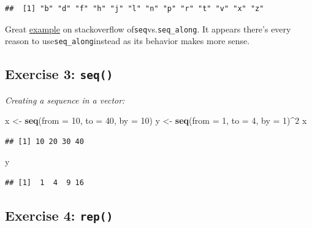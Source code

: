 \documentclass[
]{book}
\newenvironment{Shaded}{\begin{snugshade}}{\end{snugshade}}
\newcommand{\DataTypeTok}[1]{\textcolor[rgb]{0.13,0.29,0.53}{#1}}
\newcommand{\DecValTok}[1]{\textcolor[rgb]{0.00,0.00,0.81}{#1}}
\newcommand{\KeywordTok}[1]{\textcolor[rgb]{0.13,0.29,0.53}{\textbf{#1}}}
\newcommand{\NormalTok}[1]{#1}
\newcommand{\OperatorTok}[1]{\textcolor[rgb]{0.81,0.36,0.00}{\textbf{#1}}}
\newcommand{\StringTok}[1]{\textcolor[rgb]{0.31,0.60,0.02}{#1}}
\begin{document}
\begin{verbatim}
##  [1] "b" "d" "f" "h" "j" "l" "n" "p" "r" "t" "v" "x" "z"
\end{verbatim}

Great \href{https://stackoverflow.com/questions/13732062/what-are-examples-of-when-seq-along-works-but-seq-produces-unintended-results}{example} on stackoverflow of\texttt{seq}vs.\texttt{seq\_along}. It appears there's every reason to
use\texttt{seq\_along}instead as its behavior makes more sense.

\hypertarget{exercise-3-seq}{%
\subsection{\texorpdfstring{Exercise 3: \texttt{seq()}}{Exercise 3: seq()}}\label{exercise-3-seq}}

\emph{Creating a sequence in a vector:}

\begin{Shaded}
\begin{Highlighting}[]
\NormalTok{x <-}\StringTok{ }\KeywordTok{seq}\NormalTok{(}\DataTypeTok{from =} \DecValTok{10}\NormalTok{, }\DataTypeTok{to =} \DecValTok{40}\NormalTok{, }\DataTypeTok{by =} \DecValTok{10}\NormalTok{)}
\NormalTok{y <-}\StringTok{ }\KeywordTok{seq}\NormalTok{(}\DataTypeTok{from =} \DecValTok{1}\NormalTok{, }\DataTypeTok{to =} \DecValTok{4}\NormalTok{, }\DataTypeTok{by =} \DecValTok{1}\NormalTok{)}\OperatorTok{^}\DecValTok{2}
\NormalTok{x}
\end{Highlighting}
\end{Shaded}

\begin{verbatim}
## [1] 10 20 30 40
\end{verbatim}

\begin{Shaded}
\begin{Highlighting}[]
\NormalTok{y}
\end{Highlighting}
\end{Shaded}

\begin{verbatim}
## [1]  1  4  9 16
\end{verbatim}

\hypertarget{exercise-4-rep}{%
\subsection{\texorpdfstring{Exercise 4: \texttt{rep()}}{Exercise 4: rep()}}\label{exercise-4-rep}}
\end{document}
